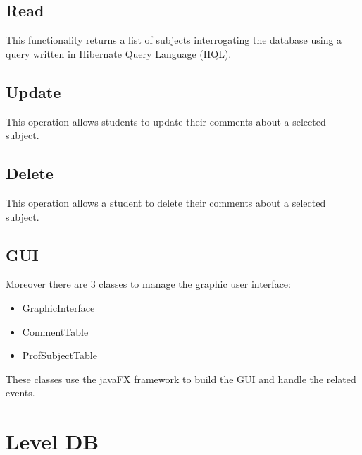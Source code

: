 \documentclass[a4paper, oneside]{article}
\begin{document}
\subsection{Read}
This functionality returns a list of subjects interrogating the database using a query written in Hibernate Query Language (HQL).\\
\vspace{2mm}

\vspace{5mm}

\subsection{Update}
This operation allows students to update their comments about a selected subject.\\
\vspace{2mm}

\vspace{5mm}

\subsection{Delete}
This operation allows a student to delete their comments about a selected subject.\\
\vspace{2mm}

\vspace{5mm}

\subsection{GUI}
Moreover there are 3 classes to manage the graphic user interface: 
\begin{itemize}
\item GraphicInterface
\item CommentTable
\item ProfSubjectTable
\end{itemize}
 These classes use the javaFX framework to build the GUI and handle the related events.

\clearpage


\section{Level DB}
\end{document}
